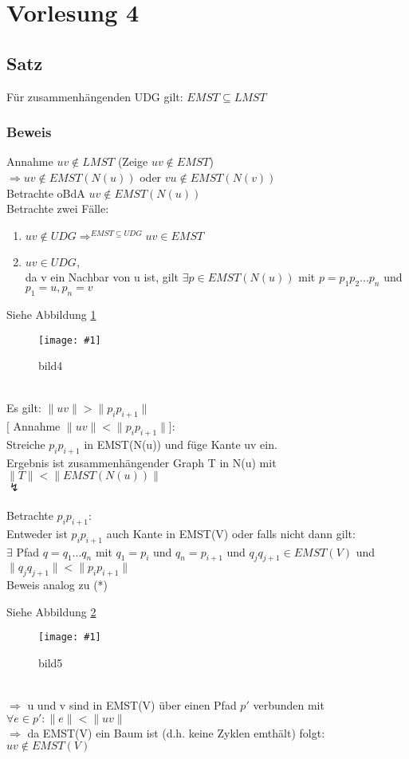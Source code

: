 \documentclass{article}
\newcommand{\bild}[4]{ %
	\begin{figure}[h!]
		\centering
		\texttt{[image: \#1]}
		\caption{#3}
		\label{#4}
	\end{figure}	
}
\newcommand{\sieheBild}[4]{
	Siehe Abbildung \ref{#4}
	\bild{#1}{#2}{#3}{#4}
}
\begin{document}
\section{Vorlesung 4}

\subsection*{Satz}
Für zusammenhängenden UDG gilt:
$EMST \subseteq  LMST$

\subsubsection*{Beweis}
Annahme $uv \not\in LMST$ (Zeige $uv \not\in EMST$)\\
$\Rightarrow uv \not\in EMST(N(u))$ oder $vu \not\in EMST(N(v))$\\
Betrachte oBdA $uv \not\in EMST(N(u))$\\
Betrachte zwei Fälle:
\begin{enumerate}
	\item $uv \not\in UDG \Rightarrow^{EMST\subseteq UDG} uv \in EMST$
	\item $uv \in UDG$,\\
	da v ein Nachbar von u ist, gilt $\exists p \in EMST(N(u))$ mit $p = p_1 p_2 ... p_n$ und $p_1 = u, p_n = v$
\end{enumerate}
\sieheBild{Bilder/4.png}{0.4}{bild4}{Bild 4}\\
Es gilt: $\|uv\| > \|p_i p_{i+1}\|$\\
$[$ Annahme $\|uv\| < \|p_i p_{i+1}\|]$:\\
Streiche $p_i p_{i+1}$ in EMST(N(u)) und füge Kante uv ein.\\
Ergebnis ist zusammenhängender Graph T in N(u) mit $\|T\| < \|EMST(N(u))\|$ \\
$\lightning$\\
\vspace*{5mm}\\
Betrachte $p_i p_{i+1}$:\\
Entweder ist $p_i p_{i+1}$ auch Kante in EMST(V) oder falls nicht dann gilt: \\
$\exists$ Pfad $q = q_1 ... q_n$ mit $q_1 = p_i$ und $q_n = p_{i+1}$ und $q_j q_{j+1} \in EMST(V)$ und $\|q_j q_{j+1}\| < \|p_i p_{i+1}\|$\\
Beweis analog zu  (*)
\sieheBild{Bilder/5.png}{0.4}{bild5}{Bild 5}\\
$\Rightarrow$ u und v sind in EMST(V) über einen Pfad $p'$ verbunden mit $\forall e \in p': \|e\| < \|uv\|$\\
$\Rightarrow$ da EMST(V) ein Baum ist (d.h. keine Zyklen emthält) folgt: $uv \not\in EMST(V)$
\end{document}
